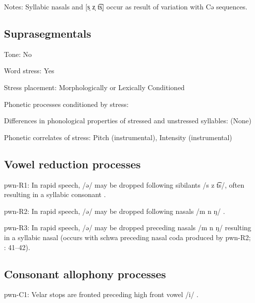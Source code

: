 {\begin{appendixdesc}
\item[Notes:] Syllabic nasals and [s̩ z̩ t͡s̩] occur as result of variation with Cə sequences.
\end{appendixdesc}
\subsection*{Suprasegmentals}
\begin{appendixdesc}
\item[Tone:] No

\item[Word stress:] Yes

\item[Stress placement:] Morphologically or Lexically Conditioned

\item[Phonetic processes conditioned by stress:]

\item[Differences in phonological properties of stressed and unstressed syllables:] (None)

\item[Phonetic correlates of stress:] Pitch (instrumental), Intensity (instrumental)
\end{appendixdesc}
\subsection*{Vowel reduction processes}
\begin{appendixdesc}

\item[pwn-R1:] In rapid speech, /ə/ may be dropped following sibilants /s z t͡s/, often resulting in a syllabic consonant \citep[40--41]{Chang2006}.

\item[pwn-R2:] In rapid speech, /ə/ may be dropped following nasals /m n ŋ/ \citep[41]{Chang2006}.

\item[pwn-R3:] In rapid speech, /ə/ may be dropped preceding nasals /m n ŋ/ resulting in a syllabic nasal (occurs with schwa preceding nasal coda produced by pwn-R2; \citealt{Chang2006}: 41--42).
\end{appendixdesc}
\subsection*{Consonant allophony processes}
\begin{appendixdesc}

\item[pwn-C1:] Velar stops are fronted preceding high front vowel /i/ \citep[22]{Chang2006}.


\end{appendixdesc}}
